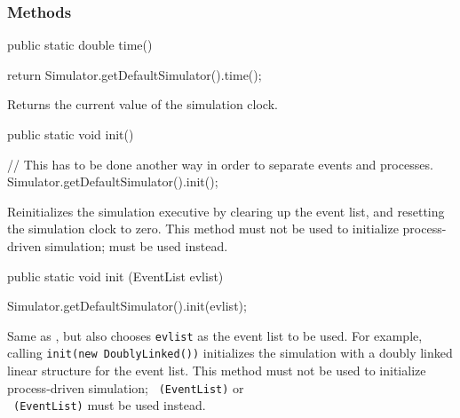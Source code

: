 \subsubsection* {Methods}

\begin{code}

   public static double time() \begin{hide} {
      return Simulator.getDefaultSimulator().time();
   }\end{hide}
\end{code}
   \begin{tabb} Returns the current value of the simulation clock. \end{tabb}
\begin{htmlonly}
\end{htmlonly}
\begin{code}

   public static void init() \begin{hide} {
     // This has to be done another way in order to separate events and processes.
      Simulator.getDefaultSimulator().init();
   }\end{hide}
\end{code}
  \begin{tabb} Reinitializes the simulation executive by clearing up the event
   list, and resetting the simulation clock to zero.
   This method must not be used to initialize process-driven
   simulation; 
   must be used instead.
  \end{tabb}
\begin{code}

   public static void init (EventList evlist) \begin{hide} {
     Simulator.getDefaultSimulator().init(evlist);
   }\end{hide}
\end{code}
  \begin{tabb} Same as , but also chooses \texttt{evlist} as the
    event list to be used. For example, calling
    \texttt{init(new DoublyLinked())} initializes the simulation
    with a doubly linked linear structure for the event list.
   This method must not be used to initialize process-driven
   simulation;
~\texttt{(EventList)} or \\
~\texttt{(EventList)}
   must be used instead.
  \end{tabb}
